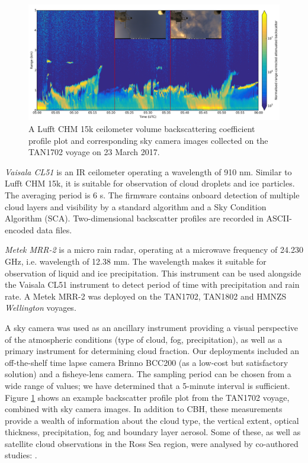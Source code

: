 \begin{figure}[t]
\includegraphics[width=\textwidth]{fig/chm15k_profile.png}
\caption[Lufft CHM 15k ceilometer volume backscattering coefficient profile plot]{
A Lufft CHM 15k ceilometer volume backscattering coefficient profile plot
and corresponding sky camera images collected on the TAN1702 voyage
on 23 March 2017.
}
\label{fig:1:chm15k-profile}
\end{figure}

\textit{Vaisala CL51} is an IR ceilometer operating a
wavelength of 910 nm. Similar to Lufft CHM 15k, it is suitable for observation
of cloud droplets and ice particles. The averaging period is 6 s.
The firmware contains onboard detection of multiple cloud layers and
visibility by a standard algorithm and a Sky Condition Algorithm (SCA).
Two-dimensional backscatter profiles are recorded in ASCII-encoded data files.

\textit{Metek MRR-2} is a micro rain radar, operating at a microwave frequency of
24.230 GHz, i.e. wavelength of 12.38 mm. The wavelength makes it suitable
for observation of liquid and ice precipitation. This instrument can
be used alongside the Vaisala CL51 instrument to detect period of time with
precipitation and rain rate. A Metek MRR-2 was deployed on the TAN1702, TAN1802
and HMNZS \textit{Wellington} voyages.

A sky camera was used as an ancillary instrument providing a visual
perspective of the atmospheric conditions (type of cloud, fog,
precipitation), as well as a primary instrument for determining cloud fraction.
Our deployments included
an off-the-shelf time lapse camera Brinno BCC200 (as a low-cost but
satisfactory solution) and a fisheye-lens camera.
The sampling period can be chosen from a wide range of values; we have
determined that a 5-minute interval is sufficient.
Figure \ref{fig:1:chm15k-profile} shows an example backscatter profile plot
from the TAN1702 voyage, combined with sky camera images. 
In addition to CBH, these measurements provide a wealth
of information about the cloud type, the vertical extent, optical thickness,
precipitation, fog and boundary layer aerosol. Some of these, as well
as satellite cloud observations in the Ross Sea region, were analysed
by co-authored studies: \cite{klekociuk2018,jolly2018,hartery2020a,hartery2020b}.

